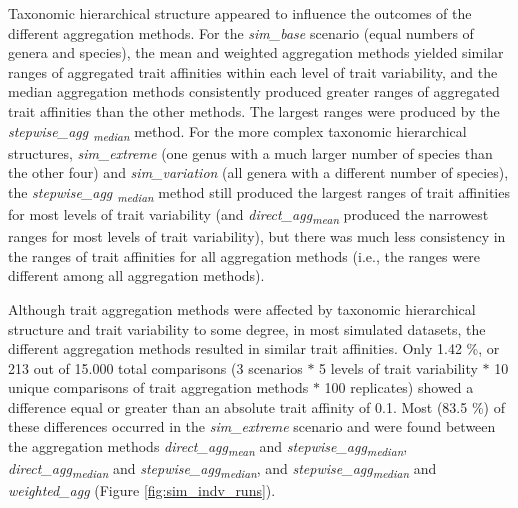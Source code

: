 \documentclass{article}
\begin{document}
Taxonomic hierarchical structure appeared to influence the outcomes of the different aggregation methods. For the \textit{sim\_base} scenario (equal numbers of genera and species), the mean and weighted aggregation methods yielded similar ranges of aggregated trait affinities within each level of trait variability, and the median aggregation methods consistently produced greater ranges of aggregated trait affinities than the other methods. The largest ranges were produced by the \textit{stepwise\_agg \textsubscript{median}} method. For the more complex taxonomic hierarchical structures, \textit{sim\_extreme} (one genus with a much larger number of species than the other four) and \textit{sim\_variation} (all genera with a different number of species), the \textit{stepwise\_agg \textsubscript{median}} method still produced the largest ranges of trait affinities for most levels of trait variability (and \textit{direct\_agg\textsubscript{mean}} produced the narrowest ranges for most levels of trait variability), but there was much less consistency in the ranges of trait affinities for all aggregation methods (i.e., the ranges were different among all aggregation methods).

Although trait aggregation methods were affected by taxonomic hierarchical structure and trait variability to some degree, in most simulated datasets, the different aggregation methods resulted in similar trait affinities. Only 1.42 \%, or 213 out of 15.000 total comparisons (3 scenarios $*$ 5 levels of trait variability $*$ 10 unique comparisons of trait aggregation methods $*$ 100 replicates) showed a difference equal or greater than an absolute trait affinity of 0.1. Most  (83.5 \%) of these differences occurred in the \textit{sim\_extreme} scenario and were found between the aggregation methods \textit{direct\_agg\textsubscript{mean}} and \textit{stepwise\_agg\textsubscript{median}}, \textit{direct\_agg\textsubscript{median}} and \textit{stepwise\_agg\textsubscript{median}}, and \textit{stepwise\_agg\textsubscript{median}} and \textit{weighted\_agg} (Figure \ref{fig:sim_indv_runs}). 
\end{document}
